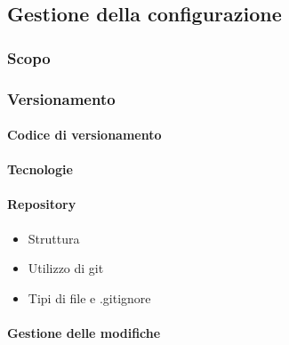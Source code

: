 \subsection{Gestione della configurazione}

	\subsubsection{Scopo}	
	\subsubsection{Versionamento}
		\paragraph{Codice di versionamento}
		\paragraph{Tecnologie}
		\paragraph{Repository}
			\begin{itemize}
				\item Struttura
				\item Utilizzo di git
				\item Tipi di file e .gitignore
			\end{itemize}
		\paragraph{Gestione delle modifiche}

	